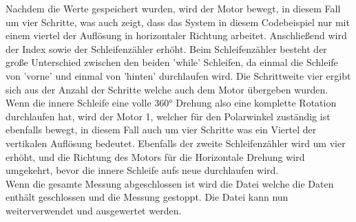 Nachdem die Werte gespeichert wurden, wird der Motor bewegt, in diesem Fall um vier Schritte, was auch zeigt, dass das System in diesem Codebeispiel nur mit einem viertel der Auflösung in horizontaler Richtung arbeitet. Anschließend wird der Index sowie der Schleifenzähler erhöht. Beim Schleifenzähler besteht der große Unterschied zwischen den beiden 'while' Schleifen, da einmal die Schleife von 'vorne' und einmal von 'hinten' durchlaufen wird. Die Schrittweite vier ergibt sich aus der Anzahl der Schritte welche auch dem Motor übergeben wurden.\\
Wenn die innere Schleife eine volle 360° Drehung also eine komplette Rotation durchlaufen hat, wird der Motor 1, welcher für den Polarwinkel zuständig ist ebenfalls bewegt, in diesem Fall auch um vier Schritte was ein Viertel der vertikalen Auflösung bedeutet. Ebenfalls der zweite Schleifenzähler wird um vier erhöht, und die Richtung des Motors für die Horizontale Drehung wird umgekehrt, bevor die innere Schleife aufs neue durchlaufen wird.\\
Wenn die gesamte Messung abgeschlossen ist wird die Datei welche die Daten enthält geschlossen und die Messung gestoppt. Die Datei kann nun weiterverwendet und ausgewertet werden.
